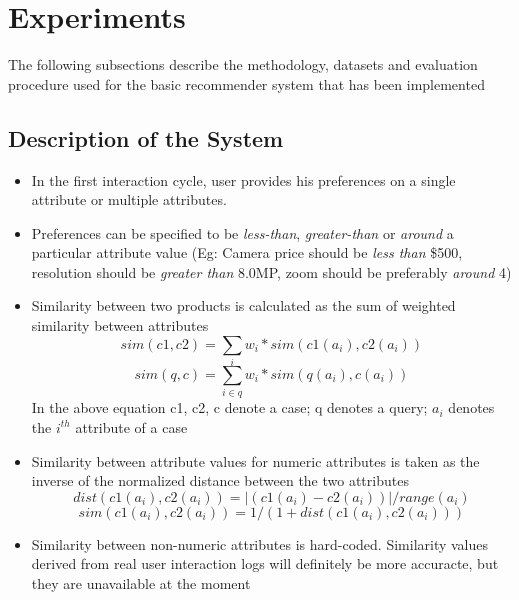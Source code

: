 \documentclass{llncs}
\begin{document}
\section{Experiments}

The following subsections describe the methodology, datasets and evaluation procedure used for the basic recommender system that has been implemented
\subsection{Description of the System}
\label{sec:methodology}
\begin{itemize}
\renewcommand{\labelitemi}{$\bullet$}
\item In the first interaction cycle, user provides his preferences on a single attribute or multiple attributes.
\item Preferences can be specified to be \textit{less-than}, \textit{greater-than} or \textit{around} a particular attribute value (Eg: Camera price should be \textit{less than} \$500, resolution should be \textit{greater than} 8.0MP, zoom should be preferably \textit{around} 4)
\item Similarity between two products is calculated as the sum of weighted similarity between attributes
\begin{equation}
sim(c1, c2) = \sum_{i} w_i*sim(c1({a_i}), c2({a_i})) 
\end{equation}
\begin{equation}
sim(q, c) = \sum_{i \in q} w_i*sim(q({a_i}), c({a_i}))
\end{equation}
In the above equation c1, c2, c denote a case; q denotes a query; $a_i$ denotes the $i^{th}$ attribute of a case

\item Similarity between attribute values for numeric attributes is taken as the inverse of the normalized distance between the two attributes
\begin{equation}
dist(c1({a_i}), c2({a_i})) = \lvert(c1({a_i}) - c2({a_i})) \rvert/range({a_i})
\end{equation}
\begin{equation}
sim(c1({a_i}), c2({a_i})) = 1/(1+dist(c1({a_i}), c2({a_i})))
\end{equation}

\item Similarity between non-numeric attributes is hard-coded. Similarity values derived from real user interaction logs will definitely be more accuracte, but they are unavailable at the moment
\end{itemize}
\end{document}
